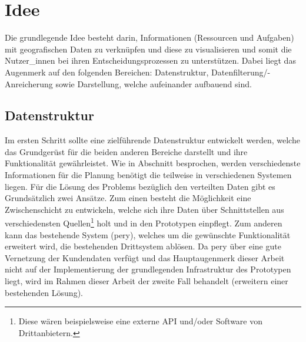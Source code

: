\documentclass[Bachelorarbeit.tex]{subfiles}
\begin{document}
\begin{comment}
Als Grundlage für den Prototypen dient die Software Pery der Firma Perfany GmbH. 
Dabei handelt es sich um 
Wobei der Fokus auf dem Ticket Modul der Software ruht. Dabei ist das Anwendungskonzept des Moduls so ausgelegt das sämtliche Aufgaben, die die Firma betreffen , einzeln als Tickets erfasst werden. 
\end{comment}

\section{Idee}
\label{chap:einfuehrung:sec:idee}

Die grundlegende Idee besteht darin, Informationen (Ressourcen und Aufgaben) mit geografischen Daten zu verknüpfen und diese zu visualisieren und somit die Nutzer\_innen bei ihren Entscheidungsprozessen zu unterstützen. 
Dabei liegt das Augenmerk auf den folgenden Bereichen: Datenstruktur, Datenfilterung/-Anreicherung sowie Darstellung, welche aufeinander aufbauend sind. 


\subsection*{Datenstruktur}
Im ersten Schritt sollte eine zielführende Datenstruktur entwickelt werden, welche das Grundgerüst für die beiden anderen Bereiche darstellt und ihre Funktionalität gewährleistet.
Wie in Abschnitt  besprochen, werden verschiedenste Informationen für die Planung benötigt die teilweise in verschiedenen Systemen liegen. 
Für die Lösung des Problems bezüglich den verteilten Daten gibt es Grundsätzlich zwei Ansätze.
Zum einen besteht die Möglichkeit eine Zwischenschicht zu entwickeln, welche sich ihre Daten über Schnittstellen aus verschiedensten Quellen\footnote{Diese wären beispielsweise eine externe \ac{API} und/oder Software von Drittanbietern.} holt und in den Prototypen einpflegt.
Zum anderen kann das bestehende System (pery), welches um die gewünschte Funktionalität erweitert wird, die bestehenden Drittsystem ablösen. 
Da pery über eine gute Vernetzung der Kundendaten verfügt und das Hauptaugenmerk dieser Arbeit nicht auf der Implementierung der grundlegenden Infrastruktur des Prototypen liegt, wird im Rahmen dieser Arbeit der zweite Fall behandelt (erweitern einer bestehenden Lösung).
\end{document}
